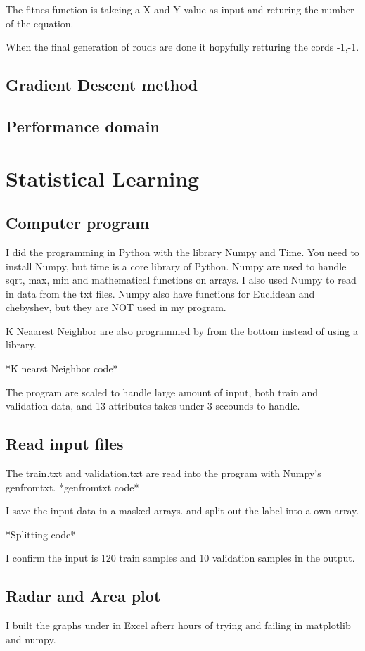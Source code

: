 \documentclass[a4paper,12pt,pdftex]{article}
\begin{document}
The fitnes function is takeing a X and Y value as input and returing the number
of the equation. 

When the final generation of rouds are done it hopyfully retturing the cords
-1,-1.



\subsection{Gradient Descent method}
\subsection{Performance domain}

\section{Statistical Learning}
\subsection{Computer program}
I did the programming in Python with the library Numpy and Time. You need to install Numpy, but time is a core
library of Python. Numpy are used to handle sqrt, max, min and mathematical functions on arrays. I also used Numpy
to read in data from the txt files. Numpy also have functions for Euclidean and chebyshev, but they are NOT used in my program.

K Neaarest Neighbor are also programmed by from the bottom instead of using a library. 

*K nearst Neighbor code*

The program are scaled to handle large amount of input, both train and validation data, and 13 attributes takes under 3 secounds to handle.

\subsection{Read input files}

The train.txt and validation.txt are read into the program with Numpy's genfromtxt.
*genfromtxt code* 

I save the input data in a masked arrays. and split out the label into a own array.

*Splitting code* 

I confirm the input is 120 train samples and 10 validation samples in the output.

\subsection{Radar and Area plot}
I built the graphs under in Excel afterr hours of trying and failing in
matplotlib and numpy. 
\end{document}
